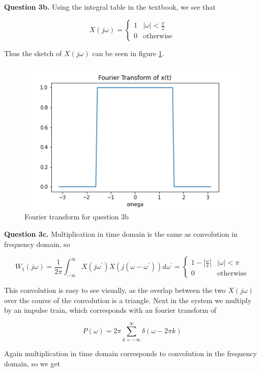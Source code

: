 \documentclass[letterpaper, reqno,11pt]{article}
\begin{document}
{\noindent\bf Question 3b.} Using the integral table in the textbook, we see that 

\[
    X(j\omega)=\begin{cases}1&|\omega|<\frac\pi2\\0&\text{otherwise}\end{cases}
\]

Thus the sketch of $X(j\omega)$ can be seen in figure \ref{fig:q3b}. 

\begin{figure}[htbp]
\centering
\includegraphics[width=\textwidth]{q3b}
\caption{Fourier transform for question 3b}
\label{fig:q3b}
\end{figure}

{\noindent\bf Question 3c.} Multiplication in time domain is the same as convolution in frequency domain, so 

\[
    W_1(j\omega)=\frac1{2\pi}\int_{-\infty}^\infty X(j\omega^\prime)X(j(\omega-\omega^\prime))d\omega^\prime=\begin{cases}1-|\frac{\omega}{\pi}|&|\omega|<\pi\\0&\text{otherwise}\end{cases}
\]

This convolution is easy to see visually, as the overlap between the two $X(j\omega)$ over the course of the convolution is a triangle. Next in the system we multiply by an impulse train, which corresponds with an fourier transform of 

\[
    P(\omega)=2\pi\sum_{k=-\infty}^\infty \delta(\omega-2\pi k)
\]

Again multiplication in time domain corresponds to convolution in the frequency domain, so we get 
\end{document}
